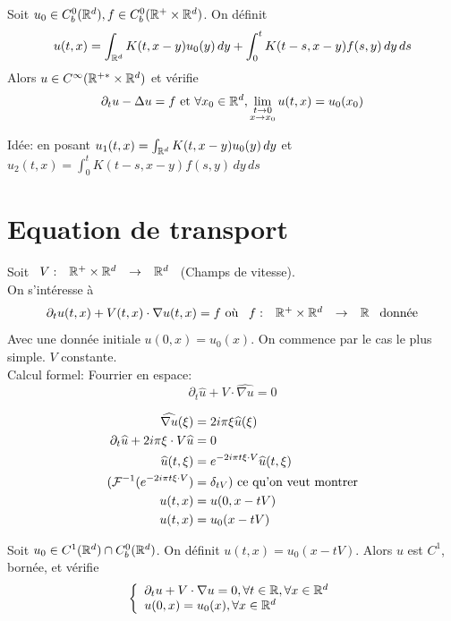 \documentclass[]{report}
\begin{document}
    \begin{prop}{}{}
        Soit $u_0\in C_b^0(\mathbb{R}^d),f\in C_b^0(\mathbb{R}^+\times \mathbb{R}^d)$. On définit
        \[u(t,x)=\int_{\mathbb{R}^d}K(t,x-y)u_0(y)\, dy+\int_{0}^t K(t-s,x-y)f(s,y)\, dy\, ds\]
        Alors $u\in C^{\infty}(\mathbb{R}^{+*}\times \mathbb{R}^d)$ et vérifie
        \[\partial_t u-\Delta u=f\text{ et }\forall x_0\in \mathbb{R}^d,\lim_{\substack{t\to 0\\ x\to x_0}}u(t,x)=u_0(x_0)\]
    \end{prop}
    
    Idée: en posant $u_1(t,x)=\int_{\mathbb{R}^d}K(t,x-y)u_0(y)\, dy$ et $u_2(t,x)=\int_{0}^t K(t-s,x-y)f(s,y)\, dy\, ds$

    \section{Equation de transport}

    Soit $\begin{array}{ccccc} V : & \mathbb{R}^+\times \mathbb{R}^d & \to & \mathbb{R}^d \end{array}$ (Champs de vitesse).\\
    On s'intéresse à
    \[\partial_t u(t,x)+V(t,x)\cdot \nabla u(t,x)=f\text{ où }\begin{array}{ccccc} f : & \mathbb{R}^+\times \mathbb{R}^d & \to & \mathbb{R} \end{array}\text{ donnée}\]
    Avec une donnée initiale $u(0,x)=u_0(x)$. On commence par le cas le plus simple. $V$ constante.\\
    Calcul formel: Fourrier en espace:
    \[\partial_t \widehat{u}+V\cdot\widehat{\nabla u}=0\]

    \begin{align*}
        \widehat{\nabla u}(\xi)&=2i\pi \xi \widehat{u}(\xi)\\
        \partial_t \widehat{u}+2i\pi \xi\cdot V \widehat{u}&=0\\
        \widehat{u}(t,\xi)&=e^{-2i\pi t\xi\cdot V}\widehat{u}(t,\xi)\\
        (\mathcal{F}^{-1}( e^{-2i\pi t\xi\cdot V}) &=\delta_{tV}) \text{ ce qu'on veut montrer}\\
        u(t,x)&=u(0,x-tV)\\
        u(t,x)&=u_0(x-tV)
    \end{align*}

    \begin{prop}{}{}
        Soit $u_0\in C^1(\mathbb{R}^d)\cap C^0_b(\mathbb{R}^d)$. On définit $u(t,x)=u_0(x-tV)$. Alors $u$ est $C^1$, bornée, et vérifie
        \[\left\{\begin{array}{ll} \partial_t u +V\cdot \nabla u=0,\forall t\in \mathbb{R},\forall x\in \mathbb{R}^d\\ u(0,x)=u_0(x),\forall x\in \mathbb{R}^d \end{array} \right.\]
    \end{prop}
\end{document}

